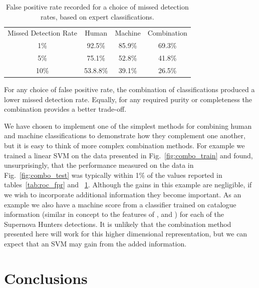 \documentclass[a4paper,fleqn,usenatbib]{mnras}
\begin{document}
\begin{table}
\begin{tabular}{|c|c|c|c|}
Missed Detection Rate & Human & Machine & Combination\\
1\% & 92.5\% & 85.9\% & 69.3\% \\
5\% & 75.1\% & 52.8\% & 41.8\% \\
10\% & 53.8.8\% & 39.1\% & 26.5\% \\
\end{tabular}
\caption{False positive rate recorded for a choice of missed detection rates, based on expert classifications.
}\label{tab:roc_mdr}
\end{table}

For any choice of false positive rate, the combination of classifications produced a lower missed detection rate. Equally, for any required purity or completeness the combination provides a better trade-off. 

We have chosen to implement one of the simplest methods for combining human and machine classifications to demonstrate how they complement one another, but it is easy to think of more complex combination methods. For example we trained a linear SVM on the data presented in Fig.~\ref{fig:combo_train} and found, unsurprisingly, that the performance measured on the data in Fig.~\ref{fig:combo_test} was typically within 1\% of the values reported in tables~\ref{tab:roc_fpr} and ~\ref{tab:roc_mdr}.  Although the gains in this example are negligible, if we wish to incorporate additional information they become important.  As an example we also have a machine score from a classifier trained on catalogue information (similar in concept to the features of \citet{Bloom12}, \citet{Brink13} and \citet{Goldstein15}) for each of the Supernova Hunters detections.  It is unlikely that the combination method presented here will work for this higher dimensional representation, but we can expect that an SVM may gain from the added information.

\section{Conclusions}
\label{sec:conclusions}
\end{document}
